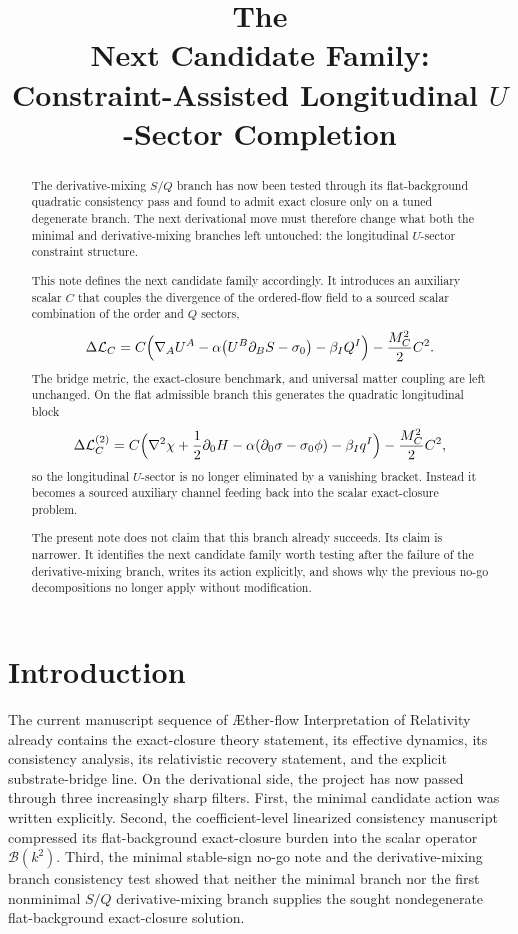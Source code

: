 \documentclass[11pt]{article}
\title{\textbf{The \TheoryName{}}\\[0.4em]
\large Next Candidate Family: Constraint-Assisted Longitudinal \texorpdfstring{\(U\)}{U}-Sector Completion}
\author{}
\date{}
\newcommand{\Aflow}{\AE{}ther-flow}
\newcommand{\TheoryName}{\Aflow{} Interpretation of Relativity}
\begin{document}
\maketitle

\begin{abstract}
The derivative-mixing \(S/Q\) branch has now been tested through its flat-background quadratic consistency pass and found to admit exact closure only on a tuned degenerate branch. The next derivational move must therefore change what both the minimal and derivative-mixing branches left untouched: the longitudinal \(U\)-sector constraint structure.

This note defines the next candidate family accordingly. It introduces an auxiliary scalar \(C\) that couples the divergence of the ordered-flow field to a sourced scalar combination of the order and \(Q\) sectors,
\[
\Delta\mathcal L_C
=
C\Bigl(\nabla_AU^A-\alpha\bigl(U^B\partial_BS-\sigma_0\bigr)-\beta_IQ^I\Bigr)
-\frac{M_C^2}{2}C^2.
\]
The bridge metric, the exact-closure benchmark, and universal matter coupling are left unchanged. On the flat admissible branch this generates the quadratic longitudinal block
\[
\Delta\mathcal L_C^{(2)}
=
C\Bigl(\nabla^2\chi+\frac{1}{2}\partial_0H-\alpha(\partial_0\sigma-\sigma_0\phi)-\beta_Iq^I\Bigr)
-\frac{M_C^2}{2}C^2,
\]
so the longitudinal \(U\)-sector is no longer eliminated by a vanishing bracket. Instead it becomes a sourced auxiliary channel feeding back into the scalar exact-closure problem.

The present note does not claim that this branch already succeeds. Its claim is narrower. It identifies the next candidate family worth testing after the failure of the derivative-mixing branch, writes its action explicitly, and shows why the previous no-go decompositions no longer apply without modification.
\end{abstract}

\section{Introduction}

The current manuscript sequence of \TheoryName{} already contains the exact-closure theory statement, its effective dynamics, its consistency analysis, its relativistic recovery statement, and the explicit substrate-bridge line. On the derivational side, the project has now passed through three increasingly sharp filters. First, the minimal candidate action was written explicitly. Second, the coefficient-level linearized consistency manuscript compressed its flat-background exact-closure burden into the scalar operator \(\mathcal B(k^2)\). Third, the minimal stable-sign no-go note and the derivative-mixing branch consistency test showed that neither the minimal branch nor the first nonminimal \(S/Q\) derivative-mixing branch supplies the sought nondegenerate flat-background exact-closure solution.
\end{document}
